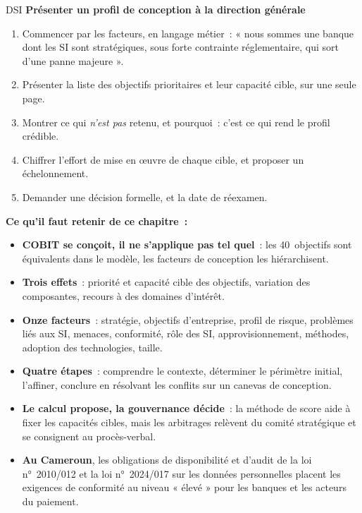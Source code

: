 \begin{boxmetier}{DSI}
\textbf{Présenter un profil de conception à la direction générale}
\begin{enumerate}
    \item Commencer par les facteurs, en langage métier~: « nous sommes une
          banque dont les SI sont stratégiques, sous forte contrainte
          réglementaire, qui sort d'une panne majeure ».
    \item Présenter la liste des objectifs prioritaires et leur capacité
          cible, sur une seule page.
    \item Montrer ce qui \emph{n'est pas} retenu, et pourquoi~: c'est ce qui
          rend le profil crédible.
    \item Chiffrer l'effort de mise en œuvre de chaque cible, et proposer un
          échelonnement.
    \item Demander une décision formelle, et la date de réexamen.
\end{enumerate}
\end{boxmetier}

\separateur

\begin{boxresume}
\textbf{Ce qu'il faut retenir de ce chapitre~:}
\begin{itemize}
    \item \textbf{COBIT se conçoit, il ne s'applique pas tel quel}~: les
          40~objectifs sont équivalents dans le modèle, les facteurs de
          conception les hiérarchisent.
    \item \textbf{Trois effets}~: priorité et capacité cible des objectifs,
          variation des composantes, recours à des domaines d'intérêt.
    \item \textbf{Onze facteurs}~: stratégie, objectifs d'entreprise, profil
          de risque, problèmes liés aux SI, menaces, conformité, rôle des
          SI, approvisionnement, méthodes, adoption des technologies,
          taille.
    \item \textbf{Quatre étapes}~: comprendre le contexte, déterminer le
          périmètre initial, l'affiner, conclure en résolvant les conflits
          sur un canevas de conception.
    \item \textbf{Le calcul propose, la gouvernance décide}~: la méthode de
          score aide à fixer les capacités cibles, mais les arbitrages
          relèvent du comité stratégique et se consignent au procès-verbal.
    \item \textbf{Au Cameroun}, les obligations de disponibilité et d'audit
          de la loi n°~2010/012 et la loi n°~2024/017 sur les données
          personnelles placent les exigences de conformité au niveau
          « élevé » pour les banques et les acteurs du paiement.
\end{itemize}
\end{boxresume}

